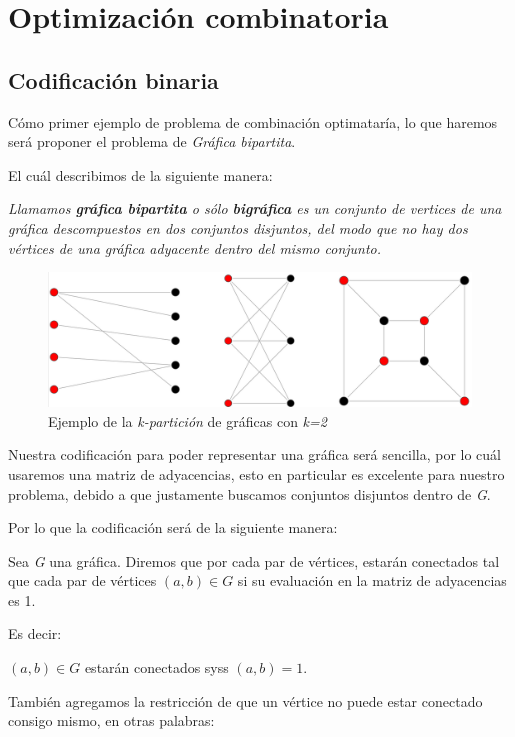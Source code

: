 \documentclass{article}
\begin{document}
\newpage
\section*{Optimización combinatoria}

\subsection*{Codificación binaria}
Cómo primer ejemplo de problema de combinación optimataría, lo que 
haremos será proponer el problema de \textit{Gráfica bipartita}.

El cuál describimos de la siguiente manera:

\textit{Llamamos \textbf{gráfica bipartita} o sólo \textbf{bigráfica} es un conjunto de vertices de una gráfica descompuestos en dos conjuntos disjuntos, del modo que no hay dos vértices de una gráfica adyacente dentro del mismo conjunto.}

\begin{figure}[h]
\begin{center}
\includegraphics[scale=0.25]{./img/bigrafica}
\caption{Ejemplo de la \textit{k-partición} de gráficas con \textit{k=2}}
\end{center}
\end{figure}

Nuestra codificación para poder representar una gráfica será 
sencilla, por lo cuál usaremos una matriz de adyacencias, esto en
particular es excelente para nuestro problema, debido a que 
justamente buscamos conjuntos disjuntos dentro de \textit{G}.

Por lo que la codificación será de la siguiente manera:

Sea \textit{G} una gráfica. Diremos que por cada par de vértices, estarán
conectados tal que cada par de vértices $(a,b) \in G$ si su 
evaluación en la matriz de adyacencias es 1.

Es decir:

$(a,b) \in G$ estarán conectados syss $(a,b)=1$.

También agregamos la restricción de que un vértice no puede estar
conectado consigo mismo, en otras palabras:
\end{document}

